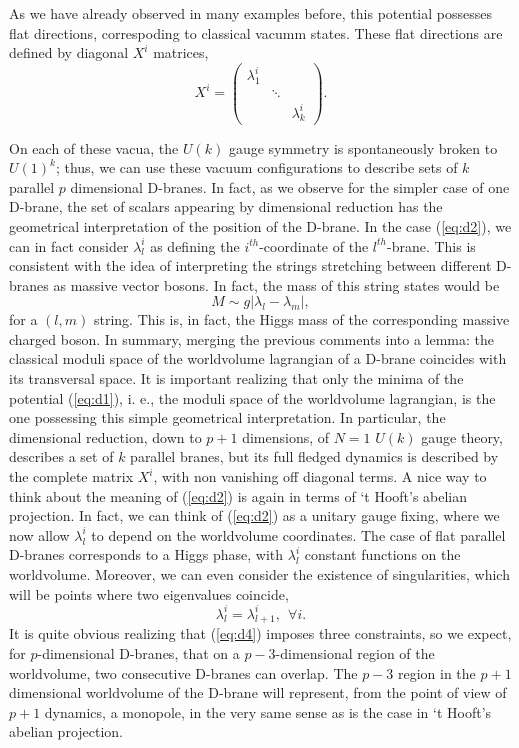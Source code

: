 As we have already observed in many examples before, this
potential possesses flat directions, correspoding to classical
vacumm states. These flat directions are defined by diagonal
$X^i$ matrices,
\begin{equation}
X^i = \left( \begin{array}{ccc} \lambda_1^i &   &   \\
				  & \ddots  &       \\
				  &  & \lambda_k^i  \end{array} \right).
\label{eq:d2}
\end{equation}
  
On each of these vacua, the $U(k)$ gauge symmetry is spontaneously broken to $U(1)^k$; thus, 
we can use these vacuum configurations to describe sets of $k$ parallel $p$ dimensional 
D-branes. In fact, as we observe for the simpler case of one D-brane, 
the set of scalars appearing by dimensional reduction has the 
geometrical interpretation of the position of the D-brane. In the case (\ref{eq:d2}), 
we can in fact consider $\lambda_l^i$ as defining the $i^{th}$-coordinate of the 
$l^{th}$-brane. This is consistent with the idea of interpreting the strings 
stretching between different D-branes as massive vector bosons. In fact, the mass 
of this string states would be
\begin{equation}
M \sim g | \lambda_l - \lambda_m |,
\label{eq:d3}
\end{equation}
for a $(l,m)$ string. This is, in fact, the Higgs mass of the corresponding 
massive charged boson. In summary, merging the previous comments into
a lemma: the classical moduli space of the worldvolume lagrangian of a
D-brane coincides with its transversal space. It is important
realizing that only the minima of the potential (\ref{eq:d1}), i.
e., the moduli space of the worldvolume lagrangian, is the one
possessing this simple geometrical interpretation. In
particular, the dimensional reduction, down to $p+1$ dimensions,
of $N=1$ $U(k)$ gauge theory, describes a set of $k$ parallel
branes, but its full fledged dynamics is described by the
complete matrix $X^i$, with non vanishing off diagonal terms. A
nice way to think about the meaning of (\ref{eq:d2}) is again in
terms of `t Hooft's abelian projection. In fact, we can think of
(\ref{eq:d2}) as a unitary gauge fixing, where we now allow
$\lambda_l^i$ to depend on the worldvolume coordinates. The case
of flat parallel D-branes corresponds to a Higgs phase, with
$\lambda_l^i$ constant functions on the worldvolume. Moreover, we
can even consider the existence of singularities, which will be
points where two eigenvalues coincide,
\begin{equation}
\lambda_l^i = \lambda_{l+1}^i, \: \: \forall i.
\label{eq:d4}
\end{equation}
It is quite obvious realizing that (\ref{eq:d4}) imposes three
constraints, so we expect, for $p$-dimensional D-branes, that on
a $p-3$-dimensional region of the worldvolume, two consecutive
D-branes can overlap. The $p-3$ region in the $p+1$ dimensional worldvolume
of the D-brane will represent, from the point of view of $p+1$
dynamics, a monopole, in the very same sense as is the case in
`t Hooft's abelian projection.
  
